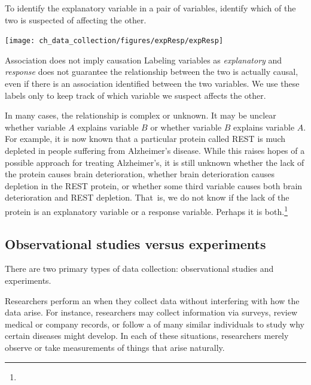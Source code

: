 \begin{tipBox}{
To identify the explanatory variable in a pair of variables, identify which of the two is suspected of affecting the other.

\hspace{10mm}\texttt{[image: ch\_data\_collection/figures/expResp/expResp]}}
\end{tipBox}

\begin{caution}{Association does not imply causation}
{Labeling variables as \emph{explanatory} and \emph{response} does not guarantee the relationship between the two is actually causal, even if there is an association identified between the two variables. We use these labels only to keep track of which variable we suspect affects the other.}
\end{caution}

In many cases, the relationship is complex or unknown. It may be unclear whether variable $A$ explains variable $B$ or whether variable $B$ explains variable $A$. For example, it is now known that a particular protein called REST is much depleted in people suffering from Alzheimer's disease. While this raises hopes of a possible approach for treating Alzheimer's, it is still unknown whether the lack of the protein causes brain deterioration, whether brain deterioration causes depletion in the REST protein, or whether some third variable causes both brain deterioration and REST depletion. That~is, we do not know if the lack of the protein is an explanatory variable or a response variable. Perhaps it is both.\footnote{}


\subsection{Observational studies versus experiments}

There are two primary types of data collection: observational studies and experiments.

Researchers perform an  when they collect data without interfering with how the data arise. For instance, researchers may collect information via surveys, review medical or company records, or follow a  of many similar individuals to study why certain diseases might develop. In each of these situations, researchers merely observe or take measurements of things that arise naturally.

